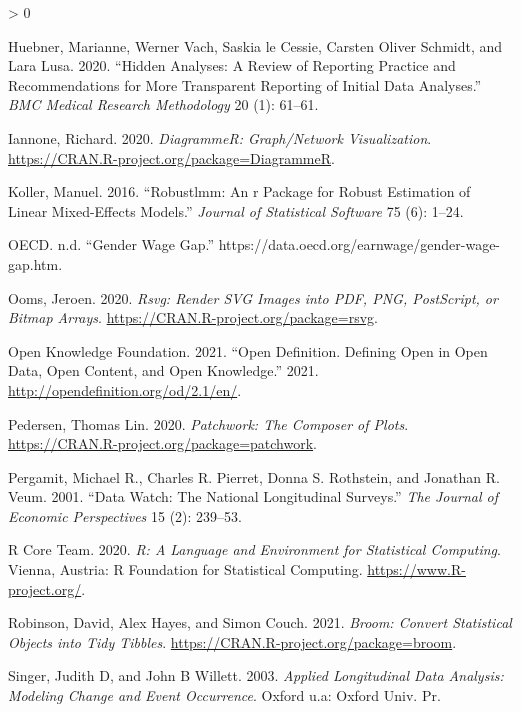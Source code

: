 \documentclass{article}
\newlength{\cslhangindent}
\newenvironment{CSLReferences}[2] %
 {%
  \setlength{\parindent}{0pt}
  \ifodd #1 \everypar{\setlength{\hangindent}{\cslhangindent}}\ignorespaces\fi
  \ifnum #2 > 0
  \setlength{\parskip}{#2\baselineskip}
  \fi
 }%
 {}
\begin{document}
\begin{CSLReferences}{1}{0}
\leavevmode\hypertarget{ref-HuebnerMarianne2020Haar}{}%
Huebner, Marianne, Werner Vach, Saskia le Cessie, Carsten Oliver Schmidt, and Lara Lusa. 2020. {``Hidden Analyses: A Review of Reporting Practice and Recommendations for More Transparent Reporting of Initial Data Analyses.''} \emph{BMC Medical Research Methodology} 20 (1): 61--61.

\leavevmode\hypertarget{ref-DiagrammeR}{}%
Iannone, Richard. 2020. \emph{DiagrammeR: Graph/Network Visualization}. \url{https://CRAN.R-project.org/package=DiagrammeR}.

\leavevmode\hypertarget{ref-KollerManuel2016rARP}{}%
Koller, Manuel. 2016. {``Robustlmm: An r Package for Robust Estimation of Linear Mixed-Effects Models.''} \emph{Journal of Statistical Software} 75 (6): 1--24.

\leavevmode\hypertarget{ref-OECD}{}%
OECD. n.d. {``Gender Wage Gap.''} https://data.oecd.org/earnwage/gender-wage-gap.htm.

\leavevmode\hypertarget{ref-rsvg}{}%
Ooms, Jeroen. 2020. \emph{Rsvg: Render SVG Images into PDF, PNG, PostScript, or Bitmap Arrays}. \url{https://CRAN.R-project.org/package=rsvg}.

\leavevmode\hypertarget{ref-opendata}{}%
Open Knowledge Foundation. 2021. {``Open Definition. Defining Open in Open Data, Open Content, and Open Knowledge.''} 2021. \url{http://opendefinition.org/od/2.1/en/}.

\leavevmode\hypertarget{ref-patchwork}{}%
Pedersen, Thomas Lin. 2020. \emph{Patchwork: The Composer of Plots}. \url{https://CRAN.R-project.org/package=patchwork}.

\leavevmode\hypertarget{ref-MichaelRPergamit2001DWTN}{}%
Pergamit, Michael R., Charles R. Pierret, Donna S. Rothstein, and Jonathan R. Veum. 2001. {``Data Watch: The National Longitudinal Surveys.''} \emph{The Journal of Economic Perspectives} 15 (2): 239--53.

\leavevmode\hypertarget{ref-R}{}%
R Core Team. 2020. \emph{R: A Language and Environment for Statistical Computing}. Vienna, Austria: R Foundation for Statistical Computing. \url{https://www.R-project.org/}.

\leavevmode\hypertarget{ref-broom}{}%
Robinson, David, Alex Hayes, and Simon Couch. 2021. \emph{Broom: Convert Statistical Objects into Tidy Tibbles}. \url{https://CRAN.R-project.org/package=broom}.

\leavevmode\hypertarget{ref-SingerJudithD2003Alda}{}%
Singer, Judith D, and John B Willett. 2003. \emph{Applied Longitudinal Data Analysis: Modeling Change and Event Occurrence}. Oxford u.a: Oxford Univ. Pr.


\end{CSLReferences}
\end{document}

